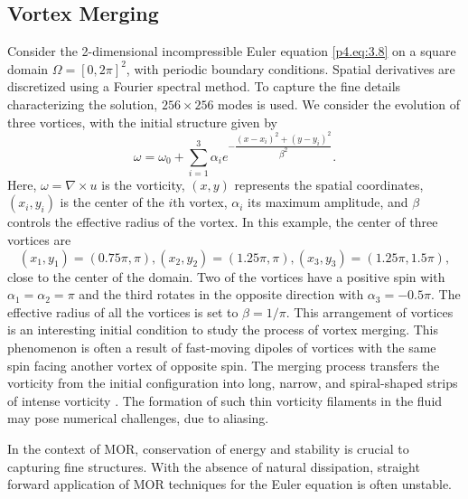 \subsection{Vortex Merging} \label{p4.sec:res.1}
Consider the 2-dimensional incompressible Euler equation \eqref{p4.eq:3.8} on a square domain $\Omega = [0,2\pi]^2$, with periodic boundary conditions. Spatial derivatives are discretized using a Fourier spectral method. To capture the fine details characterizing the solution, $256\times 256$ modes is used. We consider the evolution of three vortices, with the initial structure given by
\begin{equation}\label{p4.eqn:initial_cond_vort}
\omega = \omega_0 + \sum_{i=1}^{3} \alpha_i e^{-\dfrac{\left(x-x_i\right)^{2}+\left(y-y_i\right)^{2}}{\beta^2}}.
\end{equation}
Here, $\omega = \nabla \times u$ is the vorticity, $(x,y)$ represents the spatial coordinates, $\left( x_i, y_i\right)$ is the center of the $i$th vortex, $\alpha_i$ its maximum amplitude, and $\beta$ controls the effective radius of the vortex. In this example, the center of three vortices are 
\begin{equation}
\left( x_1, y_1 \right) = \left(0.75\pi,\pi\right) , \left( x_2, y_2 \right) = \left(1.25\pi,\pi\right), \left( x_3, y_3 \right) = \left(1.25\pi,1.5\pi\right),
\end{equation}
close to the center of the domain. Two of the vortices have a positive spin with $\alpha_1 = \alpha_2 = \pi$ and the third rotates in the opposite direction with $\alpha_3 = -0.5\pi$. The effective radius of all the vortices is set to $\beta = 1 / \pi$. This arrangement of vortices is an interesting initial condition to study the process of vortex merging. This phenomenon is often a result of fast-moving dipoles of vortices with the same spin facing another vortex \cite{filaments_vort2} of opposite spin. The merging process transfers the vorticity from the initial configuration into long, narrow, and spiral-shaped strips of intense vorticity \cite{filaments_vort}. The formation of such thin vorticity filaments in the fluid may pose numerical challenges, due to aliasing. 

In the context of MOR, conservation of energy and stability is crucial to capturing fine structures. With the absence of natural dissipation, straight forward application of MOR techniques for the Euler equation is often unstable.


